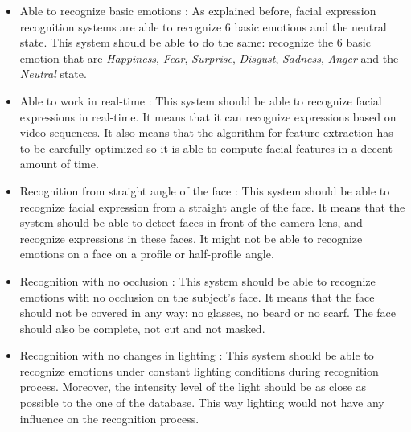 \begin{itemize}
  \item Able to recognize basic emotions : 
  \noindent As explained before, facial expression recognition systems are able to recognize 6 basic emotions and the neutral state. This system should be able to do the same: recognize the 6 basic emotion that are \textit{Happiness}, \textit{Fear}, \textit{Surprise}, \textit{Disgust}, \textit{Sadness}, \textit{Anger} and the \textit{Neutral} state.
\newline

  \item Able to work in real-time : 
  \noindent This system should be able to recognize facial expressions in real-time. It means that it can recognize expressions based on video sequences. It also means that the algorithm for feature extraction has to be carefully optimized so it is able to compute facial features in a decent amount of time. 
\newline

  \item Recognition from straight angle of the face : 
  \noindent This system should be able to recognize facial expression from a straight angle of the face. It means that the system should be able to detect faces in front of the camera lens, and recognize expressions in these faces. It might not be able to recognize emotions on a face on a profile or half-profile angle.
\newline

  \item Recognition with no occlusion : 
  \noindent This system should be able to recognize emotions with no occlusion on the subject's face. It means that the face should not be covered in any way: no glasses, no beard or no scarf. The face should also be complete, not cut and not masked.
\newline

  \item Recognition with no changes in lighting : 
  \noindent This system should be able to recognize emotions under constant lighting conditions during recognition process. Moreover, the intensity level of the light should be as close as possible to the one of the database. This way lighting would not have any influence on the recognition process.
\newline
\end{itemize}











